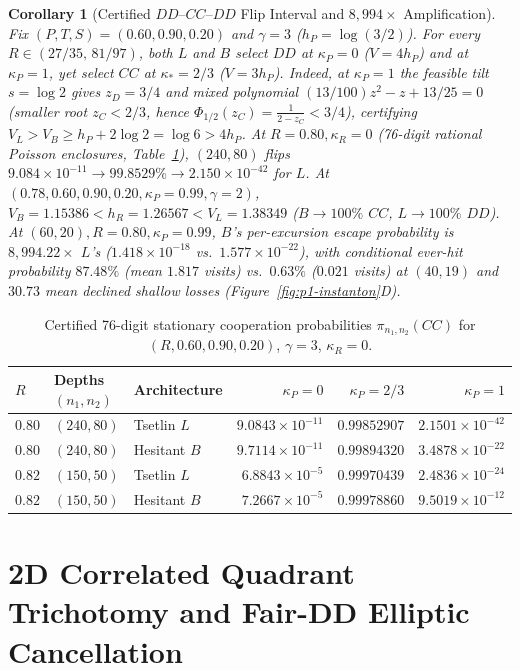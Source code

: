 \documentclass[11pt,reqno]{amsart}
\newtheorem{corollary}[theorem]{Corollary}
\theoremstyle{definition}
\theoremstyle{remark}
\begin{document}
\begin{corollary}[Certified $DD$--$CC$--$DD$ Flip Interval and $8{,}994\times$ Amplification]\label{cor:showcase}
Fix $(P,T,S)=(0.60,0.90,0.20)$ and $\gamma=3$ ($h_P = \log(3/2)$). For every $R \in (27/35,\, 81/97)$, both $L$ and $B$ select $DD$ at $\kappa_P=0$ ($V=4h_P$) and at $\kappa_P=1$, yet select $CC$ at $\kappa_* = 2/3$ ($V=3h_P$). Indeed, at $\kappa_P=1$ the feasible tilt $s = \log 2$ gives $z_D = 3/4$ and mixed polynomial $(13/100)z^2 - z + 13/25 = 0$ (smaller root $z_C < 2/3$, hence $\Phi_{1/2}(z_C) = \frac{1}{2-z_C} < 3/4$), certifying $V_L > V_B \ge h_P + 2\log 2 = \log 6 > 4 h_P$. At $R=0.80, \kappa_R=0$ (76-digit rational Poisson enclosures, Table~\ref{tab:showcase}), $(240,80)$ flips $9.084\times 10^{-11} \to 99.8529\% \to 2.150\times 10^{-42}$ for $L$. At $(0.78,0.60,0.90,0.20, \kappa_P=0.99, \gamma=2)$, $V_B = 1.15386 < h_R = 1.26567 < V_L = 1.38349$ ($B\to 100\%$ $CC$, $L\to 100\%$ $DD$). At $(60,20), R=0.80, \kappa_P=0.99$, $B$'s per-excursion escape probability is $8{,}994.22\times$ $L$'s ($1.418\times 10^{-18}$ vs.\ $1.577\times 10^{-22}$), with conditional ever-hit probability $87.48\%$ (mean $1.817$ visits) vs.\ $0.63\%$ ($0.021$ visits) at $(40,19)$ and $30.73$ mean declined shallow losses (Figure~\ref{fig:p1-instanton}D).
\end{corollary}

\begin{table}[t]
\centering
\caption{Certified 76-digit stationary cooperation probabilities $\pi_{n_1,n_2}(CC)$ for $(R,0.60,0.90,0.20)$, $\gamma=3$, $\kappa_R=0$.}
\label{tab:showcase}
\begin{tabular}{@{}lllrrr@{}}
\toprule
$R$ & Depths $(n_1,n_2)$ & Architecture & $\kappa_P = 0$ & $\kappa_P = 2/3$ & $\kappa_P = 1$ \\
\midrule
$0.80$ & $(240,80)$ & Tsetlin $L$ & $9.0843 \times 10^{-11}$ & $0.99852907$ & $2.1501 \times 10^{-42}$ \\
$0.80$ & $(240,80)$ & Hesitant $B$ & $9.7114 \times 10^{-11}$ & $0.99894320$ & $3.4878 \times 10^{-22}$ \\
$0.82$ & $(150,50)$ & Tsetlin $L$ & $6.8843 \times 10^{-5}$ & $0.99970439$ & $2.4836 \times 10^{-24}$ \\
$0.82$ & $(150,50)$ & Hesitant $B$ & $7.2667 \times 10^{-5}$ & $0.99978860$ & $9.5019 \times 10^{-12}$ \\
\bottomrule
\end{tabular}
\end{table}

\section{2D Correlated Quadrant Trichotomy and Fair-DD Elliptic Cancellation}
\end{document}
